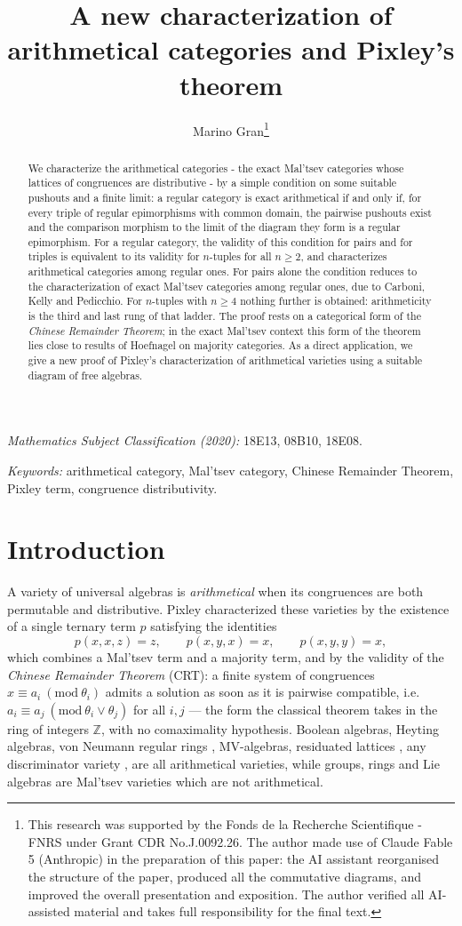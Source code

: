 \documentclass[11pt,a4paper]{article}
\title{A new characterization of arithmetical categories and Pixley's theorem
}
\author{Marino Gran\thanks{This research was supported by the Fonds de la Recherche
Scientifique - FNRS under Grant CDR No.J.0092.26. 
The author made use of Claude Fable 5 (Anthropic) in the
preparation of this paper: the AI assistant reorganised the structure
of the paper, produced all the commutative diagrams, and improved the
overall presentation and exposition. The author verified all AI-assisted material
and takes full responsibility for the final text.
}}
\date{}
\theoremstyle{plain}
\theoremstyle{definition}
\theoremstyle{remark}
\theoremstyle{plain}
\newcommand{\md}[1]{\ (\mathrm{mod}\ #1)}
\begin{document}
\maketitle

\begin{abstract}
We characterize the arithmetical categories - the
exact Mal'tsev categories whose lattices of congruences are
distributive - by a simple condition on 
some suitable pushouts and a finite limit: a regular category is exact arithmetical if and only if, for every triple of regular epimorphisms with
common domain, the pairwise pushouts exist and the comparison morphism to
the limit of the diagram they form is a regular epimorphism. For a regular category, the validity of
this condition for pairs and for triples is equivalent to its validity for
$n$-tuples for all $n \ge 2$, and characterizes arithmetical categories
among regular ones. For pairs alone the condition reduces to the
characterization of exact Mal'tsev categories among regular ones, due to
Carboni, Kelly and Pedicchio. For $n$-tuples with
$n \ge 4$ nothing further is obtained: arithmeticity is the third and last
rung of that ladder. The proof rests on a categorical form of the \emph{Chinese
Remainder Theorem}; in the exact Mal'tsev context this form
of the theorem lies close to results of Hoefnagel on majority categories. As a direct
application, we give a new proof of Pixley's characterization of
arithmetical varieties using a suitable diagram of free algebras. \end{abstract}

\noindent\emph{Mathematics Subject Classification (2020):} 18E13, 08B10, 18E08.

\medskip

\noindent\emph{Keywords:} arithmetical category, Mal'tsev category, Chinese Remainder Theorem, Pixley term, congruence distributivity.

\section{Introduction}

A variety of universal algebras is \emph{arithmetical} when its congruences
are both permutable and distributive. Pixley \cite{Pixley} characterized
these varieties by the existence of a single ternary term $p$ satisfying
the identities
\[
p(x,x,z) = z, \qquad p(x,y,x) = x, \qquad p(x,y,y) = x,
\]
which combines a Mal'tsev term and a majority term, and by the validity of
the \emph{Chinese Remainder Theorem} (CRT): a finite system of congruences
$x \equiv a_i \md{\theta_i}$ admits a solution as soon as it is pairwise
compatible, i.e.\ $a_i \equiv a_j \md{\theta_i \vee \theta_j}$ for all
$i, j$ --- the form the classical theorem takes in the ring of integers $\mathbb{Z}$, with no
comaximality hypothesis. Boolean
algebras, Heyting algebras, von Neumann regular rings \cite{GRos}, MV-algebras, residuated lattices \cite{GJKO}, any discriminator
variety \cite{BS}, are all arithmetical varieties, while groups, rings and Lie algebras are Mal'tsev varieties which are not arithmetical.
\end{document}
